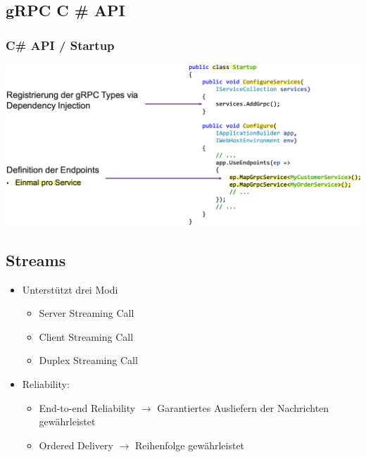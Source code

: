 \subsection{gRPC C \# API}
\subsubsection{C\# API / Startup}
\begin{center}
    \includegraphics[scale=.35]{graphic/gprc/api start.png}
\end{center}
\vspace{-8pt}


\subsection{Streams}
\begin{itemize}
    \item Unterstützt drei Modi
    \begin{itemize}
        \item Server Streaming Call
        \item Client Streaming Call
        \item Duplex Streaming Call
    \end{itemize}
    \item Reliability:
    \begin{itemize}
        \item End-to-end Reliability $\rightarrow$ Garantiertes Ausliefern der Nachrichten gewährleistet
        \item Ordered Delivery $\rightarrow$ Reihenfolge gewährleistet
    \end{itemize}
\end{itemize}

